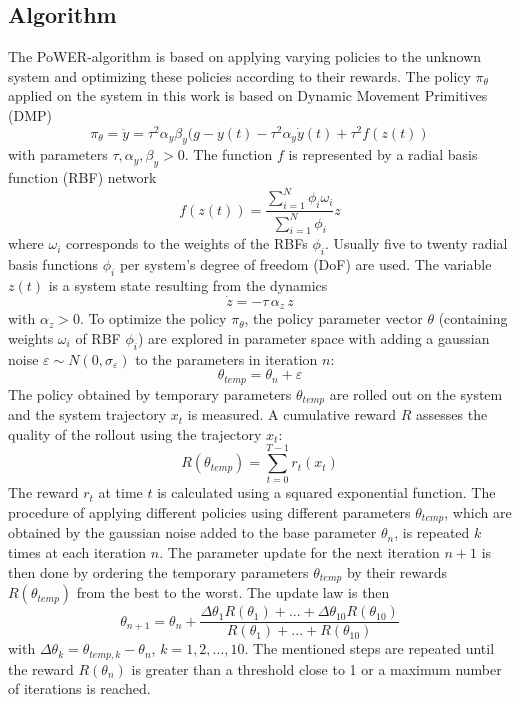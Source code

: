 \documentclass[letterpaper, 10 pt, conference]{ieeeconf}  %
\begin{document}
\subsection{Algorithm}
The PoWER-algorithm is based on applying varying policies to the unknown system and optimizing these policies according to their rewards.
The policy $\pi_\theta$ applied on the system in this work is based on Dynamic Movement Primitives (DMP)
\begin{equation}
\pi_{\theta}=\ddot{y}=\tau^{2}\alpha_y\beta_y(g-y(t)-\tau^{2}\alpha_y \dot{y}(t)+\tau^{2}f(z(t))
\end{equation}
with parameters $\tau,\alpha_y, \beta_y>0$.
The function $f$ is represented by a radial basis function (RBF) network 
\begin{equation}
f(z(t))=\frac{\sum_{i=1}^N \phi_i \omega_i}{\sum_{i=1}^N \phi_i}z 
\end{equation}
where $\omega_i$ corresponds to the weights of the RBFs $\phi_i$. Usually five to twenty radial basis functions $\phi_i$ per system's degree of freedom (DoF) are used. The variable $z(t)$ is a system state resulting from the dynamics 
\begin{equation}
\dot{z}=-\tau\,\alpha_z \,z 
\end{equation}
with $\alpha_z>0$.
To optimize the policy $\pi_\theta$, the policy parameter vector $\theta$ (containing weights $\omega_i$ of RBF $\phi_i$) are explored in parameter space with adding a gaussian noise $\varepsilon \sim N(0,\sigma_{\varepsilon})$ to the parameters in iteration $n$:
\begin{equation}
\theta_{temp}=\theta_n+\varepsilon
\end{equation}
The policy obtained by temporary parameters $\theta_{temp}$ are rolled out on the system and the system trajectory $x_t$ is measured. A cumulative reward $R$ assesses the quality of the rollout using the trajectory $x_t$: %
\begin{equation}
R(\theta_{temp})=\sum_{t=0}^{T-1} r_t(x_t) 
\end{equation}
The reward $r_t$ at time $t$ is calculated using a squared exponential function. The procedure of applying different policies using different parameters $\theta_{temp}$, which are obtained by the gaussian noise added to the base parameter $\theta_n$, is repeated $k$ times at each iteration $n$. The parameter update for the next iteration $n+1$ is then done by ordering the temporary parameters $\theta_{temp}$ by their rewards $R(\theta_{temp})$ from the best to the worst. The update law is then
\begin{equation}
\theta_{n+1}=\theta_n+\frac{\Delta\theta_1 R(\theta_1)+...+\Delta\theta_{10} R(\theta_{10})}{R(\theta_1)+...+R(\theta_{10})}
\end{equation}
with $\Delta\theta_k=\theta_{temp,k}-\theta_n$, $k=1,2,...,10$. 
The mentioned steps are repeated until the reward $R(\theta_n)$ is greater than a threshold close to 1 or a maximum number of iterations is reached.
\end{document}
